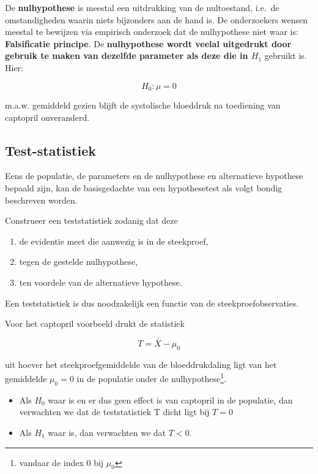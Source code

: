 \documentclass[
  dutch,
  letterpaper,
  12pt]{book}
\providecommand{\tightlist}{%
  \setlength{\itemsep}{0pt}\setlength{\parskip}{0pt}}
\theoremstyle{definition}
\theoremstyle{definition}
\theoremstyle{definition}
\theoremstyle{remark}
\begin{document}
De \textbf{nulhypothese} is meestal een uitdrukking van de nultoestand,
i.e.~de omstandigheden waarin niets bijzonders aan de hand is. De
onderzoekers wensen meestal te bewijzen via empirisch onderzoek dat de
nulhypothese niet waar is: \textbf{Falsificatie principe}. De
\textbf{nulhypothese wordt veelal uitgedrukt door gebruik te maken van
dezelfde parameter als deze die in \(H_1\)} gebruikt is. Hier:

\[H_0 : \mu=0\]

m.a.w. gemiddeld gezien blijft de systolische bloeddruk na toediening
van captopril onveranderd.

\subsection{Test-statistiek}\label{test-statistiek}

Eens de populatie, de parameters en de nulhypothese en alternatieve
hypothese bepaald zijn, kan de basisgedachte van een hypothesetest als
volgt bondig beschreven worden.

Construeer een teststatistiek zodanig dat deze

\begin{enumerate}
\def\labelenumi{\arabic{enumi}.}
\tightlist
\item
  de evidentie meet die aanwezig is in de steekproef,
\item
  tegen de gestelde nulhypothese,
\item
  ten voordele van de alternatieve hypothese.
\end{enumerate}

Een teststatistiek is dus noodzakelijk een functie van de
steekproefobservaties.

Voor het captopril voorbeeld drukt de statistiek

\[T=\bar X - \mu_0\]

uit hoever het steekproefgemiddelde van de bloeddrukdaling ligt van het
gemiddelde \(\mu_0=0\) in de populatie onder de nulhypothese\footnote{vandaar
  de index 0 bij \(\mu_0\)}.

\begin{itemize}
\tightlist
\item
  Als \(H_0\) waar is en er dus geen effect is van captopril in de
  populatie, dan verwachten we dat de teststatistiek T dicht ligt bij
  \(T=0\)
\item
  Als \(H_1\) waar is, dan verwachten we dat \(T<0\).
\end{itemize}
\end{document}
